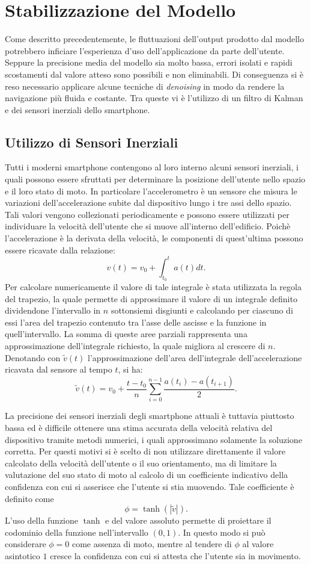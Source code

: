 \section{Stabilizzazione del Modello}
Come descritto precedentemente, le fluttuazioni dell'output prodotto dal
modello potrebbero inficiare l'esperienza d'uso dell'applicazione da parte
dell'utente. Seppure la precisione media del modello sia molto bassa, errori
isolati e rapidi scostamenti dal valore atteso sono possibili e non
eliminabili. Di conseguenza si è reso necessario applicare alcune tecniche di
\emph{denoising} in modo da rendere la navigazione più fluida e costante. Tra
queste vi è l'utilizzo di un filtro di Kalman e dei sensori inerziali dello
smartphone.
\subsection{Utilizzo di Sensori Inerziali}
Tutti i moderni smartphone contengono al loro interno alcuni sensori inerziali,
i quali possono essere sfruttati per determinare la posizione dell'utente nello
spazio e il loro stato di moto. In particolare l'accelerometro è un sensore che
misura le variazioni dell'accelerazione subite dal dispositivo lungo i tre assi
dello spazio. Tali valori vengono collezionati periodicamente e possono essere
utilizzati per individuare la velocità dell'utente che si muove all'interno
dell'edificio. Poichè l'accelerazione è la derivata della velocità, le
componenti di quest'ultima possono essere ricavate dalla relazione:
\[v(t) = v_0 + \int_{t_0}^t{a(t) dt}. \]
Per calcolare numericamente il valore di tale integrale è stata utilizzata la
regola del trapezio, la quale permette di approssimare il valore di un
integrale definito dividendone l'intervallo in \(n\) sottonsiemi disgiunti e
calcolando per ciascuno di essi l'area del trapezio contenuto tra l'asse delle
ascisse e la funzione in quell'intervallo. La somma di queste aree parziali
rappresenta una approssimazione dell'integrale richiesto, la quale migliora al
crescere di \(n\). Denotando con \(\tilde{v}(t)\) l'approssimazione dell'area
dell'integrale dell'accelerazione ricavata dal sensore al tempo \(t\), si ha:
\[ \tilde{v}(t) = 
  v_0 + \frac{t - t_0}{n} \sum_{i=0}^{n-1} {\frac{a(t_i) - a(t_{i+1})}{2}}. \]

La precisione dei sensori inerziali degli smartphone attuali è tuttavia
piuttosto bassa ed è difficile ottenere una stima accurata della velocità
relativa del dispositivo tramite metodi numerici, i quali approssimano
solamente la soluzione corretta. Per questi motivi si è scelto di non
utilizzare direttamente il valore calcolato della velocità dell'utente o il suo
orientamento, ma di limitare la valutazione del suo stato di moto al calcolo di
un coefficiente indicativo della confidenza con cui si asserisce che l'utente
si stia muovendo. Tale coefficiente è definito come
\[ \phi = \tanh(|\tilde{v}|). \]
L'uso della funzione \(\tanh\) e del valore assoluto permette di proiettare il
codominio della funzione nell'intervallo \( (0,1) \). In questo modo
si può considerare \(\phi = 0\) come assenza di moto, mentre al tendere di
\(\phi\) al valore asintotico \(1\) cresce la confidenza con cui si attesta
che l'utente sia in movimento.

